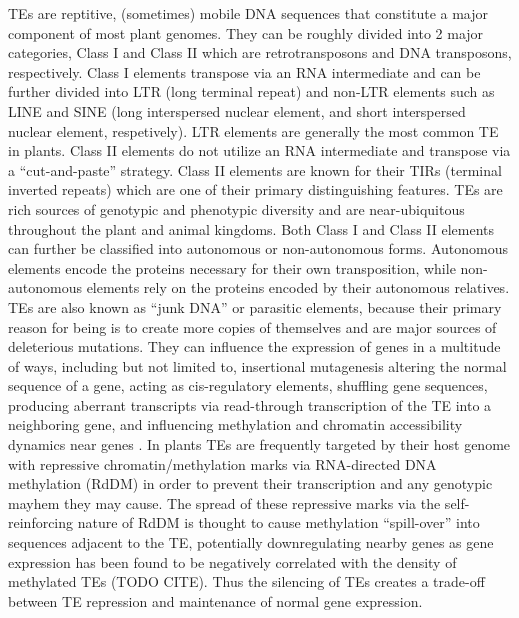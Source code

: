 \documentclass[fleqn,10pt]{olplainarticle}
\begin{document}
TEs are reptitive, (sometimes) mobile DNA sequences that constitute a major component of most plant genomes.
They can be roughly divided into 2 major categories, Class I and Class II which are retrotransposons and DNA transposons, respectively.
Class I elements transpose via an RNA intermediate and can be further divided into LTR (long terminal repeat) and non-LTR elements such as LINE and SINE (long interspersed nuclear element, and short interspersed nuclear element, respetively).
LTR elements are generally the most common TE in plants.
Class II elements do not utilize an RNA intermediate and transpose via a ``cut-and-paste'' strategy.
Class II elements are known for their TIRs (terminal inverted repeats) which are one of their primary distinguishing features.
TEs are rich sources of genotypic and phenotypic diversity and are near-ubiquitous throughout the plant and animal kingdoms.
Both Class I and Class II elements can further be classified into autonomous or non-autonomous forms.
Autonomous elements encode the proteins necessary for their own transposition, while non-autonomous elements rely on the proteins encoded by their autonomous relatives. \\

TEs are also known as ``junk DNA'' or parasitic elements, because their primary reason for being is to create more copies of themselves and are major sources of deleterious mutations.
They can influence the expression of genes in a multitude of ways, including but not limited to, insertional mutagenesis altering the normal sequence of a gene, acting as cis-regulatory elements, shuffling gene sequences, producing aberrant transcripts via read-through transcription of the TE into a neighboring gene, and influencing methylation and chromatin accessibility dynamics near genes \cite{Lisch2013,Choi2018a}.
In plants TEs are frequently targeted by their host genome with repressive chromatin/methylation marks via RNA-directed DNA methylation (RdDM) in order to prevent their transcription and any genotypic mayhem they may cause. 
The spread of these repressive marks via the self-reinforcing nature of RdDM is thought to cause methylation ``spill-over'' into sequences adjacent to the TE, potentially downregulating nearby genes as gene expression has been found to be negatively correlated with the density of methylated TEs (TODO CITE).
Thus the silencing of TEs creates a trade-off between TE repression and maintenance of normal gene expression. \\
\end{document}
